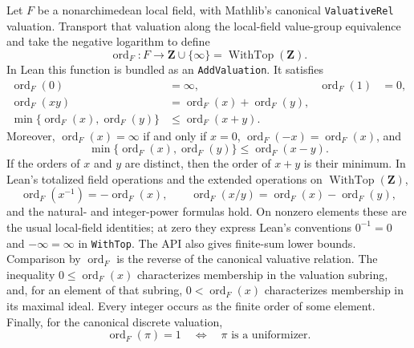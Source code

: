 \begin{definition}\label{mod:localfield-valuation}
Let $F$ be a nonarchimedean local field, with Mathlib's canonical
\texttt{ValuativeRel} valuation.  Transport that valuation along the local-field
value-group equivalence and take the negative logarithm to define
\[
  \operatorname{ord}_F:F\longrightarrow \mathbf Z\cup\{\infty\}
       =\operatorname{WithTop}(\mathbf Z).
\]
In Lean this function is bundled as an \texttt{AddValuation}.  It satisfies
\[
 \begin{aligned}
  \operatorname{ord}_F(0)&=\infty,&
  \operatorname{ord}_F(1)&=0,\\
  \operatorname{ord}_F(xy)&=\operatorname{ord}_F(x)+\operatorname{ord}_F(y),\\
  \min\{\operatorname{ord}_F(x),\operatorname{ord}_F(y)\}
    &\leq \operatorname{ord}_F(x+y).
 \end{aligned}
\]
Moreover, $\operatorname{ord}_F(x)=\infty$ if and only if $x=0$,
$\operatorname{ord}_F(-x)=\operatorname{ord}_F(x)$, and
\[
 \min\{\operatorname{ord}_F(x),\operatorname{ord}_F(y)\}
   \leq \operatorname{ord}_F(x-y).
\]
If the orders of $x$ and $y$ are distinct, then the order of $x+y$ is
their minimum.  In Lean's totalized field operations and the extended
operations on $\operatorname{WithTop}(\mathbf Z)$,
\[
 \operatorname{ord}_F(x^{-1})=-\operatorname{ord}_F(x),\qquad
 \operatorname{ord}_F(x/y)=\operatorname{ord}_F(x)-\operatorname{ord}_F(y),
\]
and the natural- and integer-power formulas hold.  On nonzero elements these
are the usual local-field identities; at zero they express Lean's conventions
$0^{-1}=0$ and $-\infty=\infty$ in \texttt{WithTop}.  The API also gives
finite-sum lower bounds.
Comparison by $\operatorname{ord}_F$ is the reverse of the canonical valuative relation.
The inequality $0\leq\operatorname{ord}_F(x)$ characterizes membership in the valuation
subring, and, for an element of that subring, $0<\operatorname{ord}_F(x)$ characterizes
membership in its maximal ideal.  Every integer occurs as the finite order of
some element.  Finally, for the canonical discrete valuation,
\[
  \operatorname{ord}_F(\pi)=1
  \quad\Longleftrightarrow\quad
  \pi\text{ is a uniformizer}.
\]


\end{definition}
